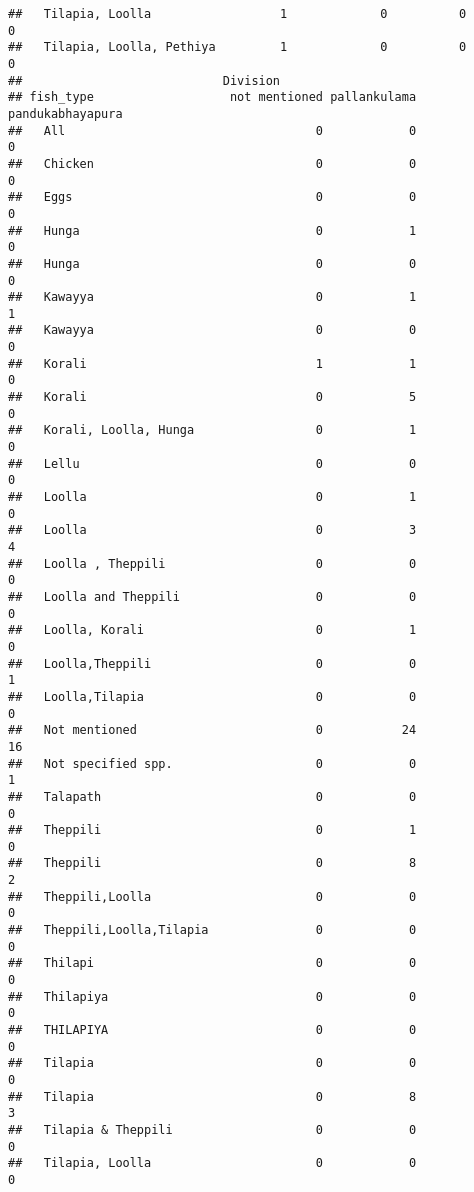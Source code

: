 \documentclass[
]{article}
\begin{document}
\begin{verbatim}
##   Tilapia, Loolla                  1             0          0             0
##   Tilapia, Loolla, Pethiya         1             0          0             0
##                            Division
## fish_type                   not mentioned pallankulama pandukabhayapura
##   All                                   0            0                0
##   Chicken                               0            0                0
##   Eggs                                  0            0                0
##   Hunga                                 0            1                0
##   Hunga                                 0            0                0
##   Kawayya                               0            1                1
##   Kawayya                               0            0                0
##   Korali                                1            1                0
##   Korali                                0            5                0
##   Korali, Loolla, Hunga                 0            1                0
##   Lellu                                 0            0                0
##   Loolla                                0            1                0
##   Loolla                                0            3                4
##   Loolla , Theppili                     0            0                0
##   Loolla and Theppili                   0            0                0
##   Loolla, Korali                        0            1                0
##   Loolla,Theppili                       0            0                1
##   Loolla,Tilapia                        0            0                0
##   Not mentioned                         0           24               16
##   Not specified spp.                    0            0                1
##   Talapath                              0            0                0
##   Theppili                              0            1                0
##   Theppili                              0            8                2
##   Theppili,Loolla                       0            0                0
##   Theppili,Loolla,Tilapia               0            0                0
##   Thilapi                               0            0                0
##   Thilapiya                             0            0                0
##   THILAPIYA                             0            0                0
##   Tilapia                               0            0                0
##   Tilapia                               0            8                3
##   Tilapia & Theppili                    0            0                0
##   Tilapia, Loolla                       0            0                0

\end{verbatim}
\end{document}

